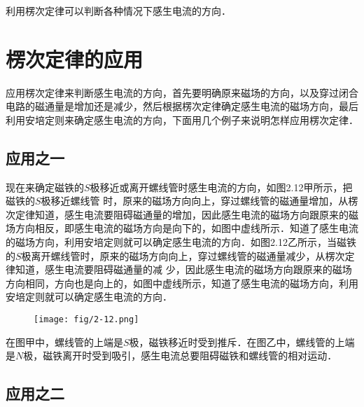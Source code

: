 利用楞次定律可以判断各种情况下感生电流的方向．

\section{楞次定律的应用}
应用楞次定律来判断感生电流的方向，首先要明确原来磁场的方向，以及穿过闭合电路的磁通量是增加还是减少，然后根据楞次定律确定感生电流的磁场方向，最后利用安培定则来确定感生电流的方向，下面用几个例子来说明怎样应用楞次定律．

\subsection*{应用之一}


现在来确定磁铁的$S$极移近或离开螺线管时感生电流的方向，如图2.12甲所示，把磁铁的$S$极移近螺线管
时，原来的磁场方向向上，穿过螺线管的磁通量增加，从楞次定律知道，感生电流要阻碍磁通量的增加，因此感生电流的磁场方向跟原来的磁场方向相反，即感生电流的磁场方向是向下的，如图中虚线所示．知道了感生电流的磁场方向，利用安培定则就可以确定感生电流的方向．如图2.12乙所示，当磁铁的$S$极离开螺线管时，原来的磁场方向向上，穿过螺线管的磁通量减少，从楞次定律知道，感生电流要阻碍磁通量的减
少，因此感生电流的磁场方向跟原来的磁场方向相同，方向也是向上的，如图中虚线所示，知道了感生电流的磁场方向，利用安培定则就可以确定感生电流的方向．
\begin{figure}[htp]\centering
\texttt{[image: fig/2-12.png]}
\caption{}
\end{figure}

在图甲中，螺线管的上端是$S$极，磁铁移近时受到推斥．在图乙中，螺线管的上端是$N$极，磁铁离开时受到吸引，感生电流总要阻碍磁铁和螺线管的相对运动．

\subsection*{应用之二}


